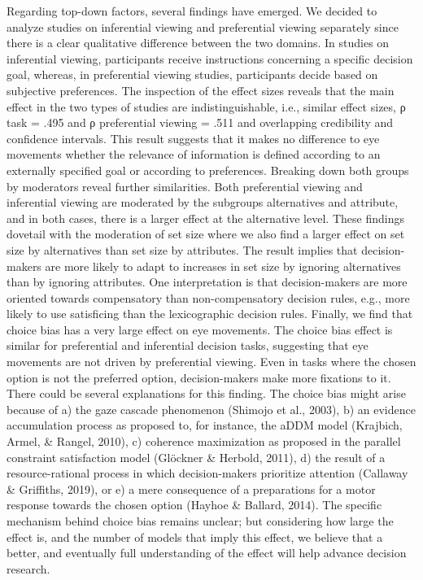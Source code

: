 \documentclass{article}
\begin{document}
Regarding top-down factors, several findings have emerged. We decided to analyze studies on inferential viewing and preferential viewing separately since there is a clear qualitative difference between the two domains. In studies on inferential viewing, participants receive instructions concerning a specific decision goal, whereas, in preferential viewing studies, participants decide based on subjective preferences. The inspection of the effect sizes reveals that the main effect in the two types of studies are indistinguishable, i.e., similar effect sizes, ρ task = .495 and ρ preferential viewing  = .511 and overlapping credibility and confidence intervals. This result suggests that it makes no difference to eye movements whether the relevance of information is defined according to an externally specified goal or according to preferences. Breaking down both groups by moderators reveal further similarities. Both preferential viewing and inferential viewing are moderated by the subgroups alternatives and attribute, and in both cases, there is a larger effect at the alternative level. These findings dovetail with the moderation of set size where we also find a larger effect on set size by alternatives than set size by attributes. The result implies that decision-makers are more likely to adapt to increases in set size by ignoring alternatives than by ignoring attributes. One interpretation is that decision-makers are more oriented towards compensatory than non-compensatory decision rules, e.g., more likely to use satisficing than the lexicographic decision rules. 
Finally, we find that choice bias has a very large effect on eye movements. The choice bias effect is similar for preferential and inferential decision tasks, suggesting that eye movements are not driven by preferential viewing. Even in tasks where the chosen option is not the preferred option, decision-makers make more fixations to it. There could be several explanations for this finding. The choice bias might arise because of  a) the gaze cascade phenomenon (Shimojo et al., 2003), b) an evidence accumulation process as proposed to, for instance, the aDDM model (Krajbich, Armel, \& Rangel, 2010), c) coherence maximization as proposed in the parallel constraint satisfaction model (Glöckner \& Herbold, 2011), d) the result of a resource-rational process in which decision-makers prioritize attention (Callaway \& Griffiths, 2019), or e) a mere consequence of a preparations for a motor response towards the chosen option (Hayhoe \& Ballard, 2014). The specific mechanism behind choice bias remains unclear; but considering how large the effect is, and the number of models that imply this effect, we believe that a better, and eventually full understanding of the effect will help advance decision research. 
\end{document}
